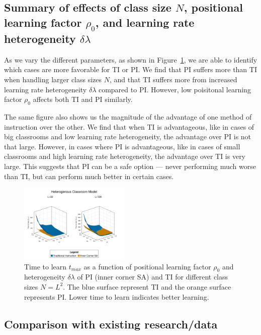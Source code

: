 \documentclass[twocolumn,secnumarabic,amssymb, nobibnotes, aps, prd]{revtex4-2}
\begin{document}
    \subsection{Summary of effects of class size $N$, positional learning factor $\rho_0$, and learning rate heterogeneity $\delta\lambda$}
        
        As we vary the different parameters, as shown in Figure~\ref{fig:Params effect summary t}, we are able to identify which cases are more favorable for TI or PI.
        We find that PI suffers more than TI when handling larger class sizes $N$, and that TI suffers more from increased learning rate heterogeneity $\delta\lambda$ compared to PI.
        However, low poisitonal learning factor $\rho_0$ affects both TI and PI similarly.

        The same figure also shows us the magnitude of the advantage of one method of instruction over the other.
        We find that when TI is advantageous, like in cases of big classrooms and low learning rate heterogeneity, the advantage over PI is not that large.
        However, in cases where PI is advantageous, like in cases of small classrooms and high learning rate heterogeneity, the advantage over TI is very large.
        This suggests that PI can be a safe option --- never performing much worse than TI, but can perform much better in certain cases.

        \begin{figure}[htbp!]
            \centering
            \includegraphics[width=0.47\textwidth]{figures/2D-BPCAIH-analysis/rho-dl-t plots/32-128 comparison.png}
            \caption{Time to learn $t_{max}$ as a function of positional learning factor $\rho_0$ and heterogeneity $\delta\lambda$ of PI (inner corner SA) and TI for different class sizes $N=L^2$.
            The blue surface represent TI and the orange surface represents PI.
            Lower time to learn indicates better learning.}
            \label{fig:Params effect summary t}
        \end{figure}

    \subsection{Comparison with existing research/data}
        
\end{document}
